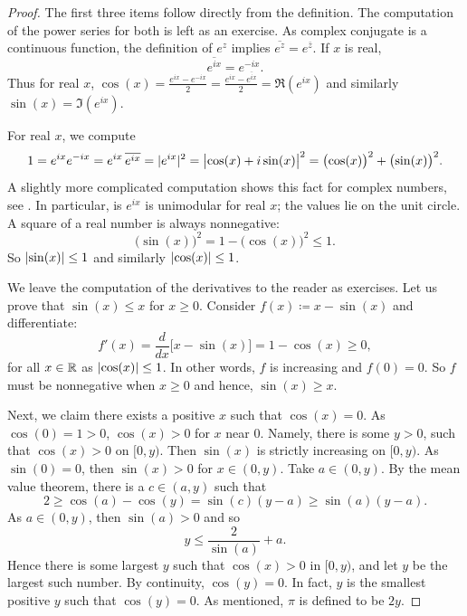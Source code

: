 \begin{proof}
The first three items follow directly from the definition.
The computation of the power series for both is left as an exercise.
As complex conjugate is a continuous function, the definition
of $e^z$ implies
$\overline{e^z} = e^{\bar{z}}$.  If
$x$ is real,
\begin{equation*}
\overline{e^{ix}} = e^{-ix} .
\end{equation*}
Thus for real $x$,
$\cos(x) =
\frac{e^{ix}-e^{-ix}}{2} =
\frac{e^{ix}-\overline{e^{ix}}}{2} =
\Re (e^{ix})$
and similarly $\sin(x) = \Im (e^{ix})$.

For real $x$, we compute
\begin{equation*}
1 =  e^{ix} e^{-ix}
= e^{ix} \, \overline{e^{ix}}
= \lvert {e^{ix}} \rvert^2
= \bigl\lvert {\cos(x) + i \sin(x)} \bigr\rvert^2
= {\bigl( \cos(x) \bigr)}^2 + {\bigl( \sin(x) \bigr)}^2 .
\end{equation*}
A slightly more complicated computation shows this fact for
complex numbers, see .
In particular, is $e^{ix}$ is unimodular for real $x$;
the values lie on the unit circle.
A square of a real number is always nonnegative:
\begin{equation*}
{\bigl(\sin(x)\bigr)}^2 = 1-{\bigl(\cos(x)\bigr)}^2 \leq 1 .
\end{equation*}
So $\lvert {\sin(x)} \rvert \leq 1$ and similarly 
$\lvert {\cos(x)} \rvert \leq 1$.

We leave the computation of the derivatives to the reader as exercises.
Let us prove that $\sin(x) \leq x$ for $x \geq 0$.
Consider
$f(x) \coloneqq x-\sin(x)$ and differentiate:
\begin{equation*}
f'(x) = \frac{d}{dx} \bigl[ x - \sin(x) \bigr]
=
1 -\cos(x) \geq 0 ,
\end{equation*}
for all $x \in {\mathbb{R}}$ as $\lvert {\cos(x)} \rvert \leq 1$.
In other words, $f$ is increasing and $f(0) = 0$.
So $f$ must be nonnegative when $x \geq 0$ and hence, $\sin(x) \geq x$.

Next, we claim there exists a positive $x$ such that $\cos(x) = 0$.
As $\cos(0) = 1 > 0$, $\cos(x) > 0$
for $x$ near $0$.  Namely,
there is some
$y > 0$, such that $\cos(x) > 0$ on $[0,y)$.
Then $\sin(x)$ is strictly
increasing on $[0,y)$.  As $\sin(0) = 0$, then
$\sin(x) > 0$ for $x \in (0,y)$.  Take $a \in (0,y)$.  By
the mean value theorem, there is a $c \in (a,y)$ such that
\begin{equation*}
2 \geq \cos(a)-\cos(y) = \sin(c)(y-a) \geq \sin(a)(y-a) .
\end{equation*}
As $a \in (0,y)$, then $\sin(a) > 0$ and so
\begin{equation*}
y \leq \frac{2}{\sin(a)} + a .
\end{equation*}
Hence there is some largest $y$ such that $\cos(x) > 0$ in $[0,y)$,
and let $y$ be the largest such number.
By continuity, $\cos(y) = 0$.
In fact, $y$ is the
smallest positive $y$ such that $\cos(y) = 0$.  As mentioned,
$\pi$ is defined to be $2y$.


\end{proof}
